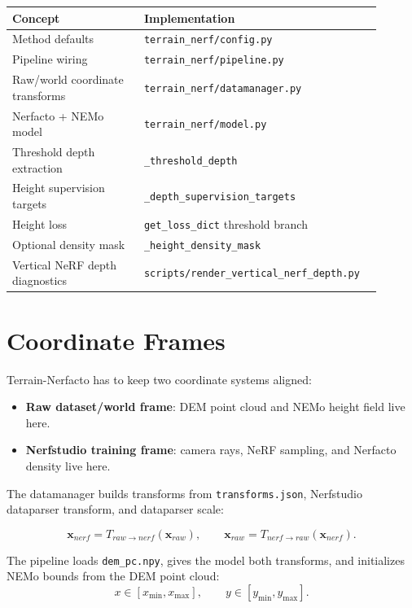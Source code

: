 \documentclass[11pt]{article}
\begin{document}
\begin{center}
\begin{tabular}{p{0.34\linewidth}p{0.56\linewidth}}
\toprule
Concept & Implementation \\
\midrule
Method defaults & \texttt{terrain\_nerf/config.py} \\
Pipeline wiring & \texttt{terrain\_nerf/pipeline.py} \\
Raw/world coordinate transforms & \texttt{terrain\_nerf/datamanager.py} \\
Nerfacto + NEMo model & \texttt{terrain\_nerf/model.py} \\
Threshold depth extraction & \texttt{\_threshold\_depth} \\
Height supervision targets & \texttt{\_depth\_supervision\_targets} \\
Height loss & \texttt{get\_loss\_dict} threshold branch \\
Optional density mask & \texttt{\_height\_density\_mask} \\
Vertical NeRF depth diagnostics & \texttt{scripts/render\_vertical\_nerf\_depth.py} \\
\bottomrule
\end{tabular}
\end{center}

\section{Coordinate Frames}

Terrain-Nerfacto has to keep two coordinate systems aligned:

\begin{itemize}[leftmargin=*]
  \item \textbf{Raw dataset/world frame}: DEM point cloud and NEMo height field live here.
  \item \textbf{Nerfstudio training frame}: camera rays, NeRF sampling, and Nerfacto density live here.
\end{itemize}

The datamanager builds transforms from \texttt{transforms.json}, Nerfstudio dataparser transform, and dataparser scale:

\[
  \mathbf{x}_{nerf} = T_{raw\rightarrow nerf}(\mathbf{x}_{raw}),
  \qquad
  \mathbf{x}_{raw} = T_{nerf\rightarrow raw}(\mathbf{x}_{nerf}).
\]

The pipeline loads \texttt{dem\_pc.npy}, gives the model both transforms, and initializes NEMo bounds from the DEM point cloud:
\[
  x \in [x_{\min},x_{\max}], \qquad y \in [y_{\min},y_{\max}].
\]
\end{document}
